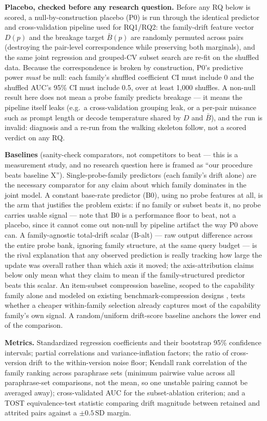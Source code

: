 \documentclass[11pt]{article}
\begin{document}
\textbf{Placebo, checked before any research question.} Before any RQ below is scored, a null-by-construction placebo (P0) is run through the identical predictor and cross-validation pipeline used for RQ1/RQ2: the family-drift feature vector $D(p)$ and the breakage target $\bar{B}(p)$ are randomly permuted across pairs (destroying the pair-level correspondence while preserving both marginals), and the same joint regression and grouped-CV subset search are re-fit on the shuffled data. Because the correspondence is broken by construction, P0's predictive power \emph{must} be null: each family's shuffled coefficient CI must include 0 and the shuffled AUC's 95\% CI must include 0.5, over at least 1,000 shuffles. A non-null result here does not mean a probe family predicts breakage --- it means the pipeline itself leaks (e.g.\ a cross-validation grouping leak, or a per-pair nuisance such as prompt length or decode temperature shared by $D$ and $\bar{B}$), and the run is invalid: diagnosis and a re-run from the walking skeleton follow, not a scored verdict on any RQ.

\textbf{Baselines} (sanity-check comparators, not competitors to beat --- this is a measurement study, and no research question here is framed as ``our procedure beats baseline X''). Single-probe-family predictors (each family's drift alone) are the necessary comparator for any claim about which family dominates in the joint model. A constant base-rate predictor (B0), using no probe features at all, is the arm that justifies the problem exists: if no family or subset beats it, no probe carries usable signal --- note that B0 is a performance floor to beat, not a placebo, since it cannot come out non-null by pipeline artifact the way P0 above can. A family-agnostic total-drift scalar (B-alt) --- raw output difference across the entire probe bank, ignoring family structure, at the same query budget --- is the rival explanation that any observed prediction is really tracking how large the update was overall rather than which axis it moved; the axis-attribution claims below only mean what they claim to mean if the family-structured predictor beats this scalar. An item-subset compression baseline, scoped to the capability family alone and modeled on existing benchmark-compression designs \citep{EssenceBench2607}, tests whether a cheaper within-family selection already captures most of the capability family's own signal. A random/uniform drift-score baseline anchors the lower end of the comparison.

\textbf{Metrics.} Standardized regression coefficients and their bootstrap 95\% confidence intervals; partial correlations and variance-inflation factors; the ratio of cross-version drift to the within-version noise floor; Kendall rank correlation of the family ranking across paraphrase sets (minimum pairwise value across all paraphrase-set comparisons, not the mean, so one unstable pairing cannot be averaged away); cross-validated AUC for the subset-ablation criterion; and a TOST equivalence-test statistic comparing drift magnitude between retained and attrited pairs against a $\pm 0.5\,\text{SD}$ margin.
\end{document}
